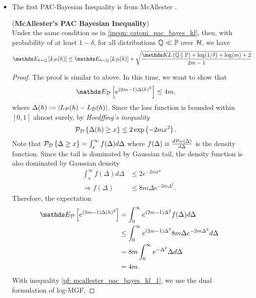 \documentclass[11pt]{article}
\begin{document}
\begin{itemize}
\item The first PAC-Bayesian Inequality is from McAllester \citep{mcallester2003pac}.
\begin{theorem} (\textbf{McAllester's PAC Bayesian Inequality})\citep{mcallester2003pac, shalev2014understanding, rasmussen2006gaussian, alquier2021user}\\
Under the same condition as in \eqref{ineqn: catoni_pac_bayes_kl}, then, with probability of at least $1 - \delta$, for all distributions ${\mathbb Q} \ll {\mathbb P}$ over ${\mathcal H}$, we have
\begin{align}
\E{h \sim \bQ}{L_{\cP}(h)} &\le \E{h \sim \bQ}{L_{\cD}(h)} + \sqrt{\frac{ \kl{\bQ}{\bP}  + \log(1/\delta) + \log(m) + 2}{2m - 1}} \label{ineqn: mcallester_pac_bayes_kl}
\end{align} 
\end{theorem}
\begin{proof}
The proof is similar to above. In this time, we want to show that 
\begin{align}
\E{\cD}{e^{(2m-1) \Delta(h)^2}} &\le 4m, \label{pf: mcallester_pac_bayes_kl_1}
\end{align} where $\Delta(h) := \left\lvert L_{{\mathcal P}}(h) - L_{{\mathcal D}}(h) \right\rvert$. Since the loss function is bounded within $[0,1]$ almost surely, by \emph{Hoedffing's inequality}
\begin{align*}
{\mathcal P}_{{\mathcal D}}\left\{\Delta(h) \ge x\right\} &\le 2\exp\left(-2m x^2\right).
\end{align*} Note that ${\mathcal P}_{{\mathcal D}}\left\{\Delta \ge x\right\} = \int_{x}^{\infty}f(\Delta) d\Delta$ where $f(\Delta) \equiv \frac{d{\mathcal P}_{{\mathcal D}}(\Delta)}{d\Delta}$ is the density function. Since the tail is dominated by Gaussian tail, the density function is also dominated by Gaussian density
\begin{align*}
 \int_{x}^{\infty}f(\Delta)  d\Delta &\le 2e^{-2m x^2}\\
 \Rightarrow f(\Delta) &\le 8m \Delta e^{-2m \Delta^2}.
\end{align*} Therefore, the expectation
\begin{align*}
\E{\cD}{e^{(2m-1) \Delta(h)^2}} &= \int_{0}^{\infty}e^{(2m-1) \Delta^2} f(\Delta) d\Delta\\
&\le  \int_{0}^{\infty}e^{(2m-1) \Delta^2} 8m \Delta e^{-2m \Delta^2}d\Delta \\
&= 8m  \int_{0}^{\infty}e^{- \Delta^2}  \Delta d\Delta\\
&= 4m.
\end{align*} With inequality \eqref{pf: mcallester_pac_bayes_kl_1}, we use the dual formulation of log-MGF, 

\end{proof}
\end{itemize}
\end{document}
